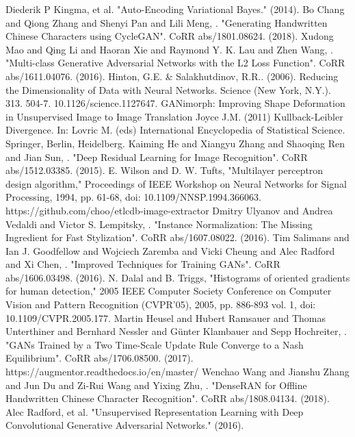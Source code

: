 \documentclass[12pt]{report}
\begin{document}
\begin{thebibliography}{9}
	 Diederik P Kingma, et al. "Auto-Encoding Variational Bayes." (2014). 
	 Bo Chang and Qiong Zhang and Shenyi Pan and Lili Meng, . "Generating Handwritten Chinese Characters using CycleGAN". CoRR abs/1801.08624. (2018).
	 Xudong Mao and Qing Li and Haoran Xie and Raymond Y. K. Lau and Zhen Wang, . "Multi-class Generative Adversarial Networks with the L2 Loss Function". CoRR abs/1611.04076. (2016).
	Hinton, G.E. \& Salakhutdinov, R.R.. (2006). Reducing the Dimensionality of Data with Neural Networks. Science (New York, N.Y.). 313. 504-7. 10.1126/science.1127647. 
	 GANimorph: Improving Shape Deformation in Unsupervised Image to Image Translation
	 Joyce J.M. (2011) Kullback-Leibler Divergence. In: Lovric M. (eds) International Encyclopedia of Statistical Science. Springer, Berlin, Heidelberg.
	Kaiming He and Xiangyu Zhang and Shaoqing Ren and Jian Sun, . "Deep Residual Learning for Image Recognition". CoRR abs/1512.03385. (2015).
	 E. Wilson and D. W. Tufts, "Multilayer perceptron design algorithm," Proceedings of IEEE Workshop on Neural Networks for Signal Processing, 1994, pp. 61-68, doi: 10.1109/NNSP.1994.366063.
	 https://github.com/choo/etlcdb-image-extractor
	Dmitry Ulyanov and Andrea Vedaldi and Victor S. Lempitsky, . "Instance Normalization: The Missing Ingredient for Fast Stylization". CoRR abs/1607.08022. (2016).
	 Tim Salimans and Ian J. Goodfellow and Wojciech Zaremba and Vicki Cheung and Alec Radford and Xi Chen, . "Improved Techniques for Training GANs". CoRR abs/1606.03498. (2016).
	 N. Dalal and B. Triggs, "Histograms of oriented gradients for human detection," 2005 IEEE Computer Society Conference on Computer Vision and Pattern Recognition (CVPR'05), 2005, pp. 886-893 vol. 1, doi: 10.1109/CVPR.2005.177.
	 Martin Heusel and Hubert Ramsauer and Thomas Unterthiner and Bernhard Nessler and Günter Klambauer and Sepp Hochreiter, . "GANs Trained by a Two Time-Scale Update Rule Converge to a Nash Equilibrium". CoRR abs/1706.08500. (2017).
	 https://augmentor.readthedocs.io/en/master/
	 Wenchao Wang and Jianshu Zhang and Jun Du and Zi-Rui Wang and Yixing Zhu, . "DenseRAN for Offline Handwritten Chinese Character Recognition". CoRR abs/1808.04134. (2018).
	Alec Radford, et al. "Unsupervised Representation Learning with Deep Convolutional Generative Adversarial Networks." (2016). 

\end{thebibliography}
\end{document}
